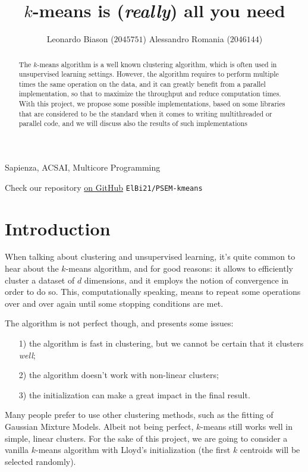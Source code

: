 \documentclass[11pt, journal]{IEEEtran}
\title{$k$-means is (\textit{really}) all you need}
\author{Leonardo Biason ($2045751$) \quad Alessandro Romania ($2046144$)}
\newcommand{\nwl}{

\vspace{11pt}

}
\begin{document}
\maketitle

\begin{abstract}
    The $k$-means algorithm is a well known clustering algorithm, which is often used in unsupervised learning settings. However, the algorithm requires to perform multiple times the same operation on the data, and it can greatly benefit from a parallel implementation, so that to maximize the throughput and reduce computation times. With this project, we propose some possible implementations, based on some libraries that are considered to be the  standard when it comes to writing multithreaded or parallel code, and we will discuss also the results of such implementations
\end{abstract}

\begin{keywords}
    Sapienza, ACSAI, Multicore Programming
\end{keywords}
\nwl
\begin{tcolorbox}[colback = Purple!20, colframe = Purple!40]
    \begin{center}
         Check our repository \href{https://www.github.com/ElBi21/PSEM-kmeans}{on GitHub}
        \verb|ElBi21/PSEM-kmeans|
    \end{center}
\end{tcolorbox}

\section{Introduction}

When talking about clustering and unsupervised learning, it's quite common to hear about the $k$-means algorithm, and for good reasons: it allows to efficiently cluster a dataset of $d$ dimensions, and it employs the notion of convergence in order to do so. This, computationally speaking, means to repeat some operations over and over again until some stopping conditions are met.
\nwl
The algorithm is not perfect though, and presents some issues:
\begin{itemize}
    \item [1)] the algorithm is fast in clustering, but we cannot be certain that it clusters \textit{well};
    \item [2)] the algorithm doesn't work with non-linear clusters;
    \item [3)] the initialization can make a great impact in the final result.
\end{itemize}
\nwl
Many people prefer to use other clustering methods, such as the fitting of Gaussian Mixture Models. Albeit not being perfect, $k$-means still works well in simple, linear clusters. For the sake of this project, we are going to consider a vanilla $k$-means algorithm with Lloyd's initialization (the first $k$ centroids will be selected randomly).
\end{document}
